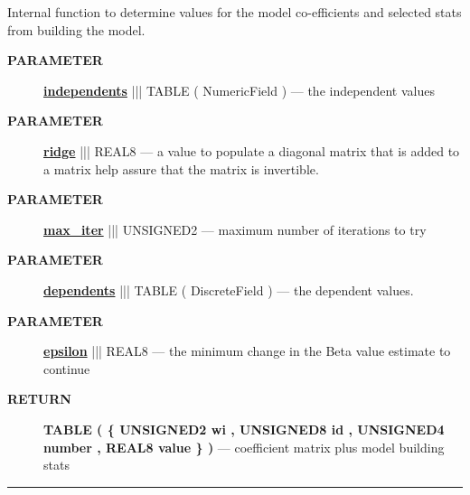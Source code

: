 Internal function to determine values for the model co-efficients and selected stats from building the model.






\par
\begin{description}
\item [\colorbox{tagtype}{\color{white} \textbf{\textsf{PARAMETER}}}] \textbf{\underline{independents}} ||| TABLE ( NumericField ) --- the independent values
\item [\colorbox{tagtype}{\color{white} \textbf{\textsf{PARAMETER}}}] \textbf{\underline{ridge}} ||| REAL8 --- a value to populate a diagonal matrix that is added to a matrix help assure that the matrix is invertible.
\item [\colorbox{tagtype}{\color{white} \textbf{\textsf{PARAMETER}}}] \textbf{\underline{max\_iter}} ||| UNSIGNED2 --- maximum number of iterations to try
\item [\colorbox{tagtype}{\color{white} \textbf{\textsf{PARAMETER}}}] \textbf{\underline{dependents}} ||| TABLE ( DiscreteField ) --- the dependent values.
\item [\colorbox{tagtype}{\color{white} \textbf{\textsf{PARAMETER}}}] \textbf{\underline{epsilon}} ||| REAL8 --- the minimum change in the Beta value estimate to continue
\end{description}







\par
\begin{description}
\item [\colorbox{tagtype}{\color{white} \textbf{\textsf{RETURN}}}] \textbf{TABLE ( \{ UNSIGNED2 wi , UNSIGNED8 id , UNSIGNED4 number , REAL8 value \} )} --- coefficient matrix plus model building stats
\end{description}




\rule{\linewidth}{0.5pt}
